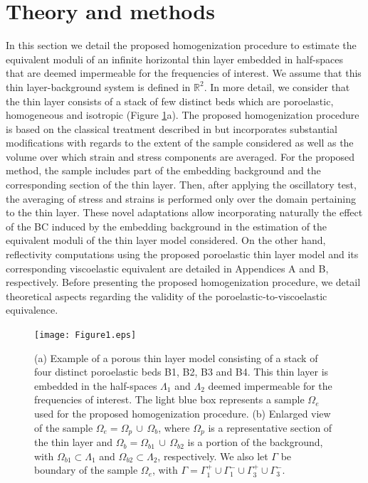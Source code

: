 \documentclass[draft]{agujournal2019}
\begin{document}
\section{Theory and methods}
In this section we detail the proposed homogenization procedure to estimate the equivalent moduli of an infinite horizontal thin layer embedded in half-spaces that are deemed impermeable for the frequencies of interest. We assume that this thin layer-background system is defined in $\mathbb R^2$. 
In more detail, we consider that the thin layer consists of a stack of few distinct beds which are poroelastic, homogeneous and isotropic (Figure \ref{fig.1}a). 
The proposed homogenization procedure is based on the classical treatment described in  but incorporates substantial modifications with regards to
the extent of the sample considered as well as the volume over which strain and stress components are averaged. For the proposed method, the sample includes part of the embedding background and the corresponding section of the thin layer. Then, after applying the oscillatory test, the averaging of stress and strains is performed only over the domain pertaining to the thin layer.
These novel adaptations allow
incorporating naturally the effect of the BC induced by the embedding background in the estimation of the equivalent moduli of the thin layer model considered. 
On the other hand, reflectivity computations using the proposed poroelastic thin layer model  and its corresponding viscoelastic equivalent are detailed in Appendices A and B, respectively. Before presenting the proposed homogenization procedure,
we detail theoretical aspects regarding the validity of the poroelastic-to-viscoelastic equivalence.

\begin{figure}[!ht]
\centering
        \texttt{[image: Figure1.eps]}
\caption{ (a) Example of a porous thin layer model consisting of a stack of four distinct poroelastic beds B1, B2, B3 and B4. This thin layer is embedded in the half-spaces $\Lambda_1$ and $\Lambda_2$ deemed impermeable for the frequencies of interest. The light blue box represents a sample $\Omega_e$ used for the proposed homogenization procedure. (b) Enlarged view of the sample $\Omega_e = \Omega_p \, \cup \, \Omega_b$, where  $\Omega_p$ is a representative section of the thin layer and  $\Omega_b= \Omega_{b1}  \, \cup \, \Omega_{b2}$ is a portion of the background, with $\Omega_{b1} \subset \Lambda_1$ and $\Omega_{b2} \subset \Lambda_2$, respectively. We also let $\Gamma$ be boundary of the  sample $\Omega_e$, with  $\Gamma = \Gamma_1^+ \cup \Gamma_1^- \cup \Gamma_3^+ \cup \Gamma_3^-$.
}
\label{fig.1}
\end{figure}
\end{document}
